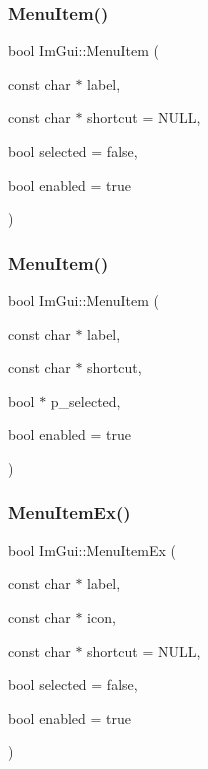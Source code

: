 \subsubsection{\texorpdfstring{Menu\+Item()}{MenuItem()}\hspace{0.1cm}{\footnotesize\ttfamily [1/2]}}
{\footnotesize\ttfamily bool Im\+Gui\+::\+Menu\+Item (\begin{DoxyParamCaption}\item[{const char $\ast$}]{label,  }\item[{const char $\ast$}]{shortcut = {\ttfamily NULL},  }\item[{bool}]{selected = {\ttfamily false},  }\item[{bool}]{enabled = {\ttfamily true} }\end{DoxyParamCaption})}

\mbox{\label{namespaceImGui_a237e76bff3088f1c2622f4aebae2356e}} 
\subsubsection{\texorpdfstring{Menu\+Item()}{MenuItem()}\hspace{0.1cm}{\footnotesize\ttfamily [2/2]}}
{\footnotesize\ttfamily bool Im\+Gui\+::\+Menu\+Item (\begin{DoxyParamCaption}\item[{const char $\ast$}]{label,  }\item[{const char $\ast$}]{shortcut,  }\item[{bool $\ast$}]{p\+\_\+selected,  }\item[{bool}]{enabled = {\ttfamily true} }\end{DoxyParamCaption})}

\mbox{\label{namespaceImGui_ab5e6e4c78805615fb4d26d4918031f9c}} 
\subsubsection{\texorpdfstring{Menu\+Item\+Ex()}{MenuItemEx()}}
{\footnotesize\ttfamily bool Im\+Gui\+::\+Menu\+Item\+Ex (\begin{DoxyParamCaption}\item[{const char $\ast$}]{label,  }\item[{const char $\ast$}]{icon,  }\item[{const char $\ast$}]{shortcut = {\ttfamily NULL},  }\item[{bool}]{selected = {\ttfamily false},  }\item[{bool}]{enabled = {\ttfamily true} }\end{DoxyParamCaption})}

